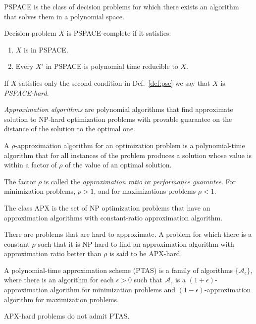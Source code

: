 \begin{definition}
	PSPACE is the class of decision problems for which there exists an algorithm that solves them in a polynomial space.
\end{definition}
\begin{definition}\label{def:psc}
	Decision problem $X$ is PSPACE-complete if it satisfies:
	\begin{enumerate}
		\item $X$ is in PSPACE.
		\item Every $X'$ in PSPACE is polynomial time reducible to $X$.
	\end{enumerate}
\end{definition}
If $X$ satisfies only the second condition in Def.~\ref{def:psc} we say that $X$ is \emph{PSPACE-hard}.

\emph{Approximation algorithms} are polynomial algorithms that find approximate solution to NP-hard optimization problems with provable guarantee on the distance of the solution to the optimal one.
\begin{definition}\cite{williamson11}
A $\rho$-approximation algorithm for an optimization problem is a polynomial-time algorithm that for all instances of the problem produces a solution whose value is within a factor of
$\rho$ of the value of an optimal solution.
\end{definition}
The factor $\rho$ is called the \emph{approximation ratio} or \emph{performance guarantee}.
For minimization problems, $\rho > 1$, and for maximizations problems $\rho < 1$.
\begin{definition}
The class APX is the set of NP optimization problems that have an approximation algorithms with constant-ratio approximation algorithm.
\end{definition}
There are problems that are hard to approximate. 
A problem for which there is a constant $\rho$ such that it is NP-hard to find an approximation algorithm with approximation ratio better than $\rho$ is said to be APX-hard.
\begin{definition}\cite{williamson11}
A polynomial-time approximation scheme (PTAS) is a family of algorithms $\{\mathcal{A}_\epsilon\}$, where there is an algorithm for each $\epsilon > 0$ such that $\mathcal{A}_\epsilon$
is a $(1+\epsilon)$-approximation algorithm for minimization problems and $(1-\epsilon)$-approximation algorithm for maximization problems.
\end{definition}
\begin{proposition}
APX-hard problems do not admit PTAS.
\end{proposition}
